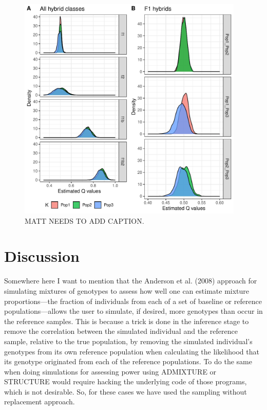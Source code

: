 {%
\begin{figure}
\newcommand{\pigsimsqscap}{\footnotesize MATT NEEDS TO ADD CAPTION.}
\includegraphics[width=0.96\textwidth]{figures/simulation-density-multipanel.pdf}
\caption[\pigsimsqscap]{\pigsimsqscap}
\label{fig:pig-sim-qs}
\end{figure}

\section*{Discussion}

Somewhere here I want to mention that the Anderson et al. (2008) approach for simulating
mixtures of genotypes to assess how well one can estimate mixture proportions---the fraction
of individuals from each of a set of baseline or reference populations---allows the user to
simulate, if desired, more genotypes than occur in the reference samples.  This is because
a trick is done in the inference stage to remove the correlation between the simulated individual
and the reference sample, relative to the true population, by removing the simulated individual's
genotypes from its own reference population when calculating the likelihood that its genotype
originated from each of the reference populations.  To do the same when doing simulations for
assessing power using ADMIXTURE or STRUCTURE would require hacking the underlying code
of those programs, which is not desirable.  So, for these cases we have used the sampling
without replacement approach.



}
